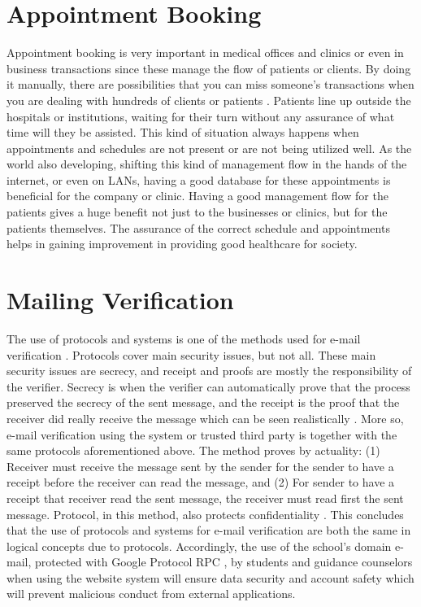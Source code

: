 \section{Appointment Booking}
Appointment booking is very important in medical offices and clinics or even in business transactions since these manage the flow of patients or clients. By doing it manually, there are possibilities that you can miss someone’s transactions when you are dealing with hundreds of clients or patients . Patients line up outside the hospitals or institutions, waiting for their turn without any assurance of what time will they be assisted. This kind of situation always happens when appointments and schedules are not present or are not being utilized well. As the world also developing, shifting this kind of management flow in the hands of the internet, or even on LANs, having a good database for these appointments is beneficial for the company or clinic. Having a good management flow for the patients gives a huge benefit not just to the businesses or clinics, but for the patients themselves. The assurance of the correct schedule and appointments helps in gaining improvement in providing good healthcare for society. 

\section{Mailing Verification}
The use of protocols and systems is one of the methods used for e-mail verification \cite{abadi2002certified}. Protocols cover main security issues, but not all. These main security issues are secrecy, and receipt and proofs are mostly the responsibility of the verifier. Secrecy is when the verifier can automatically prove that the process preserved the secrecy of the sent message, and the receipt is the proof that the receiver did really receive the message which can be seen realistically \cite{abadi2005computer}. More so, e-mail verification using the system or trusted third party is together with the same protocols aforementioned above. The method proves by actuality: (1) Receiver must receive the message sent by the sender for the sender to have a receipt before the receiver can read the message, and (2) For sender to have a receipt that receiver read the sent message, the receiver must read first the sent message. Protocol, in this method, also protects confidentiality \cite{abadi2002certified}. This concludes that the use of protocols and systems for e-mail verification are both the same in logical concepts due to protocols. Accordingly, the use of the school’s domain e-mail, protected with Google Protocol RPC \cite{protocolrpc}, by students and guidance counselors when using the website system will ensure data security and account safety which will prevent malicious conduct from external applications. 

